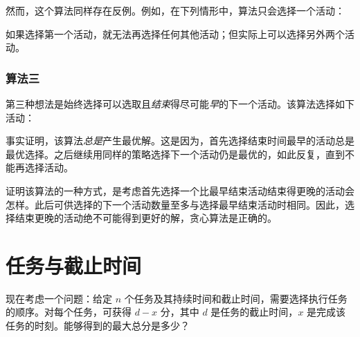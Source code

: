 然而，这个算法同样存在反例。例如，在下列情形中，算法只会选择一个活动：
\begin{center}
\end{center}
如果选择第一个活动，就无法再选择任何其他活动；但实际上可以选择另外两个活动。

\subsubsection*{算法三}

第三种想法是始终选择可以选取且\emph{结束}得尽可能\emph{早}的下一个活动。该算法选择如下活动：
\begin{center}
\end{center}

事实证明，该算法\emph{总是}产生最优解。这是因为，首先选择结束时间最早的活动总是最优选择。之后继续用同样的策略选择下一个活动仍是最优的，如此反复，直到不能再选择活动。

证明该算法的一种方式，是考虑首先选择一个比最早结束活动结束得更晚的活动会怎样。此后可供选择的下一个活动数量至多与选择最早结束活动时相同。因此，选择结束更晚的活动绝不可能得到更好的解，贪心算法是正确的。

\section{任务与截止时间}

现在考虑一个问题：给定 $n$ 个任务及其持续时间和截止时间，需要选择执行任务的顺序。对每个任务，可获得 $d-x$ 分，其中 $d$ 是任务的截止时间，$x$ 是完成该任务的时刻。能够得到的最大总分是多少？


